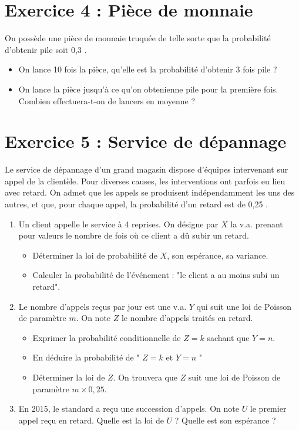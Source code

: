 \section*{Exercice 4 : Pièce de monnaie}

On possède une pièce de monnaie truquée de telle sorte que la probabilité d'obtenir pile soit 0,3 .

\begin{itemize}
    \item On lance 10 fois la pièce, qu'elle est la probabilité d'obtenir 3 fois pile ?
    \item On lance la pièce jusqu'à ce qu'on obtenienne pile pour la première fois. Combien effectuera-t-on de lancers en moyenne ?
\end{itemize}


\section*{Exercice 5 : Service de dépannage}

Le service de dépannage d'un grand magasin dispose d'équipes intervenant sur appel de la clientèle. Pour diverses causes, les interventions ont parfois eu lieu avec retard. On admet que les appels se produisent indépendamment les uns des autres, et que, pour chaque appel, la probabilité d'un retard est de 0,25 .

\begin{enumerate}
    \item Un client appelle le service à 4 reprises. On désigne par \(X\) la v.a. prenant pour valeurs le nombre de fois où ce client a dû subir un retard.
    \begin{itemize}
        \item Déterminer la loi de probabilité de \(X\), son espérance, sa variance.
        \item Calculer la probabilité de l'événement : "le client a au moins subi un retard".
    \end{itemize}
    \item Le nombre d'appels reçus par jour est une v.a. \(Y\) qui suit une loi de Poisson de paramètre \(m\). On note \(Z\) le nombre d'appels traités en retard.
    \begin{itemize}
        \item Exprimer la probabilité conditionnelle de \(Z=k\) sachant que \(Y=n\).
        \item En déduire la probabilité de " \(Z=k\) et \(Y=n\) "
        \item Déterminer la loi de \(Z\). On trouvera que \(Z\) suit une loi de Poisson de paramètre \(m \times 0,25\).
    \end{itemize}
    \item En 2015, le standard a reçu une succession d'appels. On note \(U\) le premier appel reçu en retard. Quelle est la loi de \(U\) ? Quelle est son espérance ?
\end{enumerate}
